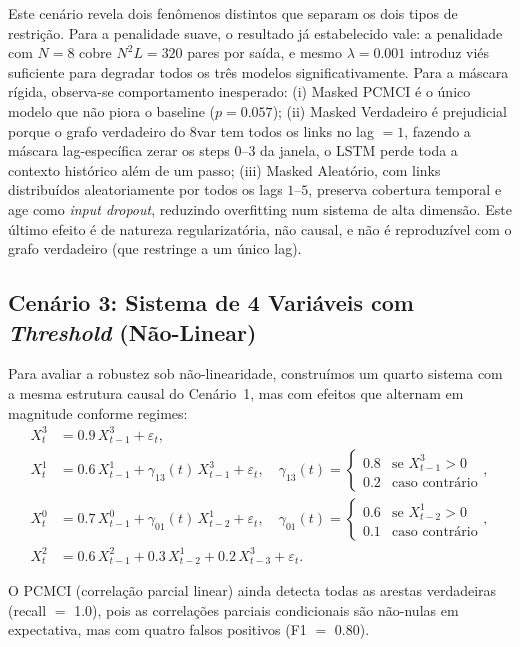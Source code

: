 \documentclass[12pt, a4paper]{article}
\begin{document}
Este cenário revela dois fenômenos distintos que separam os dois tipos de restrição. Para a penalidade suave, o resultado já estabelecido vale: a penalidade com $N=8$ cobre $N^2 L = 320$ pares por saída, e mesmo $\lambda = 0.001$ introduz viés suficiente para degradar todos os três modelos significativamente. Para a máscara rígida, observa-se comportamento inesperado: (i) Masked PCMCI é o único modelo que não piora o baseline ($p = 0.057$); (ii) Masked Verdadeiro é prejudicial porque o grafo verdadeiro do 8var tem todos os links no lag $= 1$, fazendo a máscara lag-específica zerar os steps $0$--$3$ da janela, o LSTM perde toda a contexto histórico além de um passo; (iii) Masked Aleatório, com links distribuídos aleatoriamente por todos os lags $1$--$5$, preserva cobertura temporal e age como \emph{input dropout}, reduzindo overfitting num sistema de alta dimensão. Este último efeito é de natureza regularizatória, não causal, e não é reproduzível com o grafo verdadeiro (que restringe a um único lag).

\subsection{Cenário 3: Sistema de 4 Variáveis com \emph{Threshold} (Não-Linear)}

Para avaliar a robustez sob não-linearidade, construímos um quarto sistema com a mesma estrutura causal do Cenário~1, mas com efeitos que alternam em magnitude conforme regimes:
\begin{align*}
X^3_t &= 0.9\,X^3_{t-1} + \varepsilon_t, \\
X^1_t &= 0.6\,X^1_{t-1} + \gamma_{13}(t)\,X^3_{t-1} + \varepsilon_t, \quad \gamma_{13}(t) = \begin{cases} 0.8 & \text{se } X^3_{t-1} > 0 \\ 0.2 & \text{caso contrário} \end{cases}, \\
X^0_t &= 0.7\,X^0_{t-1} + \gamma_{01}(t)\,X^1_{t-2} + \varepsilon_t, \quad \gamma_{01}(t) = \begin{cases} 0.6 & \text{se } X^1_{t-2} > 0 \\ 0.1 & \text{caso contrário} \end{cases}, \\
X^2_t &= 0.6\,X^2_{t-1} + 0.3\,X^1_{t-2} + 0.2\,X^3_{t-3} + \varepsilon_t.
\end{align*}

O PCMCI (correlação parcial linear) ainda detecta todas as arestas verdadeiras (recall $=$ 1.0), pois as correlações parciais condicionais são não-nulas em expectativa, mas com quatro falsos positivos (F1 $=$ 0.80).
\end{document}
